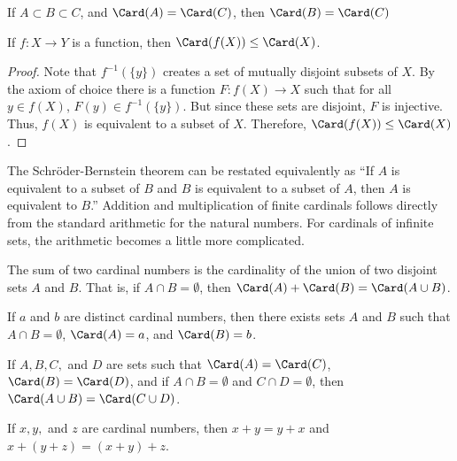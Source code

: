 \documentclass[crop=false,class=article,oneside]{standalone}
\begin{document}
        \begin{theorem*}
            If ${A}\subset{B}\subset{C}$, and
            $\Card(A)=\Card(C)$, then $\Card(B)=\Card(C)$
        \end{theorem*}
        \begin{theorem*}
            If $f:{X}\rightarrow{Y}$ is a function,
            then $\Card(f(X))\leq\Card(X)$.
        \end{theorem*}
        \begin{proof}
            Note that $f^{-1}(\{y\})$ creates a set of
            mutually disjoint subsets of $X$. By the
            axiom of choice there is a function
            $F:{f(X)}\rightarrow{X}$
            such that for all ${y}\in{f(X)}$,
            ${F(y)}\in{f^{-1}(\{y\})}$. But since these
            sets are disjoint, $F$ is injective.
            Thus, $f(X)$ is equivalent to a subset of $X$.
            Therefore, $\Card(f(X))\leq\Card(X)$.
        \end{proof}
        The Schr\"{o}der-Bernstein theorem can be restated
        equivalently as ``If $A$ is equivalent to a subset
        of $B$ and $B$ is equivalent to a subset of $A$,
        then $A$ is equivalent to $B$.''
        Addition and multiplication of finite cardinals
        follows directly from the standard arithmetic
        for the natural numbers. For cardinals of infinite
        sets, the arithmetic becomes a little more complicated.
        \begin{definition}
            The sum of two cardinal numbers is the
            cardinality of the union of two disjoint sets $A$
            and $B$. That is, if ${A}\cap{B}=\emptyset$, then
            $\Card(A)+\Card(B)=\Card({A}\cup{B})$.
        \end{definition}
        \begin{theorem*}
            If $a$ and $b$ are distinct cardinal numbers,
            then there exists sets $A$ and $B$ such that
            ${A}\cap{B}=\emptyset$, $\Card(A)=a$, and
            $\Card(B)=b$.
        \end{theorem*}
        \begin{theorem*}
            If $A,B,C,$ and $D$ are sets such that
            $\Card(A)=\Card(C)$, $\Card(B)=\Card(D)$,
            and if ${A}\cap{B}=\emptyset$ and
            ${C}\cap{D}=\emptyset$, then
            $\Card({A}\cup{B})=\Card({C}\cup{D})$.
        \end{theorem*}
        \begin{theorem*}
            If $x,y,$ and $z$ are cardinal numbers, then
            $x+y=y+x$ and $x+(y+z)=(x+y)+z$.
        \end{theorem*}
\end{document}
